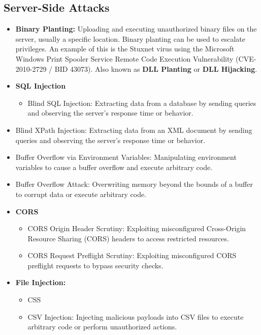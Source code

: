 \subsection{Server-Side Attacks}

\begin{itemize}
\item \textbf{Binary Planting:} Uploading and executing unauthorized binary files on the server, usually a specific location. Binary planting can be used to escalate privileges. An example of this is the Stuxnet virus using the  Microsoft Windows Print Spooler Service Remote Code Execution Vulnerability (CVE-2010-2729 / BID 43073). Also known as \textbf{DLL Planting} or \textbf{DLL Hijacking}.
\item \textbf{SQL Injection}
\begin{itemize}
    \item Blind SQL Injection: Extracting data from a database by sending queries and observing the server's response time or behavior.
\end{itemize}
\item Blind XPath Injection: Extracting data from an XML document by sending queries and observing the server's response time or behavior.
\item Buffer Overflow via Environment Variables: Manipulating environment variables to cause a buffer overflow and execute arbitrary code.
\item Buffer Overflow Attack: Overwriting memory beyond the bounds of a buffer to corrupt data or execute arbitrary code.
\item \textbf{CORS}
\begin{itemize}
    \item CORS Origin Header Scrutiny: Exploiting misconfigured Cross-Origin Resource Sharing (CORS) headers to access restricted resources.
    \item CORS Request Preflight Scrutiny: Exploiting misconfigured CORS preflight requests to bypass security checks.
\end{itemize}
\item \textbf{File Injection:}
\begin{itemize}
    \item CSS 
    \item CSV Injection: Injecting malicious payloads into CSV files to execute arbitrary code or perform unauthorized actions.
\end{itemize}


\end{itemize}

